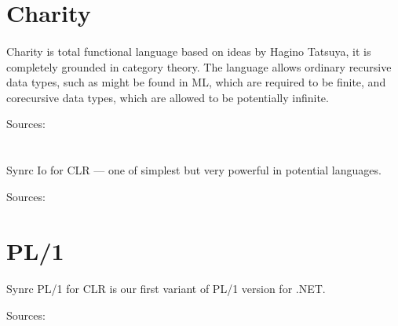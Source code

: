 \documentclass[11pt]{article}
\begin{document}

\section*{Charity}
\paragraph{}
Charity is total functional language based on ideas by Hagino Tatsuya,
it is completely grounded in category theory. The language allows
ordinary recursive data types, such as might be found in ML, which
are required to be finite, and corecursive data types, which are
allowed to be potentially infinite. 

Sources: 

\section*{}

\paragraph{}
Synrc Io for CLR --- one of simplest but very
powerful in potential languages.

Sources: 

\section*{PL/1}
\paragraph{}
Synrc PL/1 for CLR is our first variant of PL/1 version for .NET.

Sources: 




\@br
{}


\end{document}

